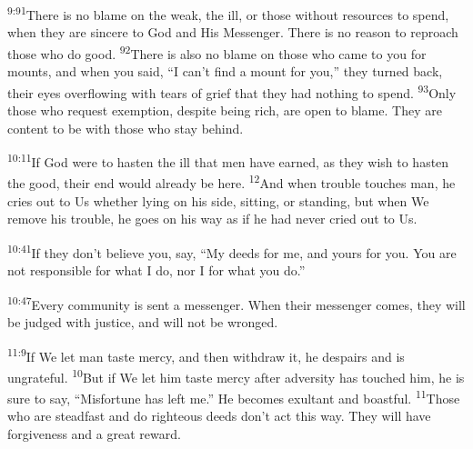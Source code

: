 \documentclass[openany,12pt,english]{book}
\newenvironment{para}{\par\pretolerance=100\tolerance=200\setlength{\emergencystretch}{0.6em}\relax}{\par}
\begin{document}
\begin{para}
    \textsuperscript{9:91}\thinspace{}There is no blame on the weak, the ill, or those with\-out resources to spend, when they are sin\-cere to God and His Mes\-sen\-ger. There is no rea\-son to re\-proach those who do good.
    \textsuperscript{92}\thinspace{}There is al\-so no blame on those who came to you for mounts, and when you said, “I can't find a mount for you,” they turned back, their eyes overflowing with tears of grief that they had noth\-ing to spend.
    \textsuperscript{93}\thinspace{}On\-ly those who re\-quest ex\-emp\-tion, de\-spite be\-ing rich, are o\-pen to blame. They are con\-tent to be with those who stay be\-hind.
\end{para}

\bigskip{}

\begin{para}
    \textsuperscript{10:11}\thinspace{}If God were to has\-ten the ill that men have earned, as they wish to has\-ten the good, their end would al\-read\-y be here.
    \textsuperscript{12}\thinspace{}And when trou\-ble touches man, he cries out to Us wheth\-er ly\-ing on his side, sit\-ting, or stand\-ing, but when We re\-move his trou\-ble, he goes on his way as if he had nev\-er cried out to Us.
\end{para}

\begin{para}
    \textsuperscript{10:41}\thinspace{}If they don't be\-lieve you, say, “My deeds for me, and yours for you. You are not re\-spon\-si\-ble for what I do, nor I for what you do.”
\end{para}

\begin{para}
    \textsuperscript{10:47}\thinspace{}Eve\-ry com\-mu\-ni\-ty is sent a mes\-sen\-ger. When their mes\-sen\-ger co\-mes, they will be judged with jus\-tice, and will not be wronged.
\end{para}

\bigskip{}

\begin{para}
    \textsuperscript{11:9}\thinspace{}If We let man taste mer\-cy, and then with\-draw it, he despairs and is un\-grate\-ful.
    \textsuperscript{10}\thinspace{}But if We let him taste mer\-cy af\-ter ad\-ver\-si\-ty has touched him, he is sure to say, “Mis\-for\-tune has left me.” He becomes ex\-ult\-ant and boast\-ful.
    \textsuperscript{11}\thinspace{}Those who are stead\-fast and do right\-eous deeds don't act this way. They will have for\-give\-ness and a great re\-ward.
\end{para}
\end{document}

